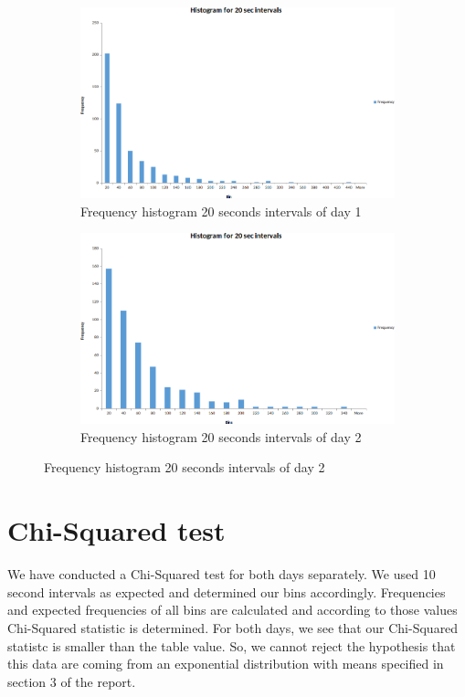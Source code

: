 \documentclass{article}
\begin{document}
\begin{figure}[H]
    \begin{subfigure}{0.5\textwidth}
        \includegraphics[width=\linewidth]{day1-hist-20sec.png}
        \caption{Frequency histogram 20 seconds intervals of day 1}
    \end{subfigure}
    \begin{subfigure}{0.5\textwidth}
        \includegraphics[width=\linewidth]{day2-hist-20sec.png}
        \caption{Frequency histogram 20 seconds intervals of day 2}
    \end{subfigure}
\end{figure}

\newpage

\section{Chi-Squared test}
We have conducted a Chi-Squared test for both days separately. We used 10 second intervals as
expected and determined our bins accordingly. Frequencies and expected frequencies of all bins
are calculated and according to those values Chi-Squared statistic is determined. For both days,
we see that our Chi-Squared statistc is smaller than the table value. So, we cannot reject the
hypothesis that this data are coming from an exponential distribution with means specified in
section 3 of the report.
\end{document}
